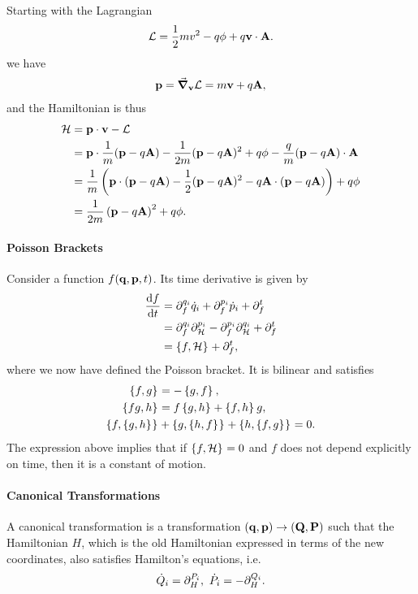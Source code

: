 
Starting with the Lagrangian
\begin{align*}
	\mathcal{L} = \frac{1}{2}mv^{2} - q\phi + q\vb{v}\cdot\vb{A}.
\end{align*}
we have
\begin{align*}
	\vb{p} = \grad_{\vb{v}}{\mathcal{L}} = m\vb{v} + q\vb{A},
\end{align*}
and the Hamiltonian is thus
\begin{align*}
	\mathcal{H} &= \vb{p}\cdot\vb{v} - \mathcal{L} \\
	     &= \vb{p}\cdot\frac{1}{m}(\vb{p} - q\vb{A}) - \frac{1}{2m}(\vb{p} - q\vb{A})^{2} + q\phi - \frac{q}{m}(\vb{p} - q\vb{A})\cdot\vb{A} \\
	     &= \frac{1}{m}\left(\vb{p}\cdot(\vb{p} - q\vb{A}) - \frac{1}{2}(\vb{p} - q\vb{A})^{2} - q\vb{A}\cdot(\vb{p} - q\vb{A})\right) + q\phi \\
	     &= \frac{1}{2m}\left(\vb{p} - q\vb{A}\right)^{2} + q\phi.
\end{align*}


\paragraph{Poisson Brackets}
Consider a function $f(\vb{q}, \vb{p}, t)$. Its time derivative is given by
\begin{align*}
	\dv{f}{t} &= \partial^{q_{i}}_{f}\dot{q}_{i} + \partial^{p_{i}}_{f}\dot{p}_{i} + \partial^{t}_{f} \\
	          &= \partial^{q_{i}}_{f}\partial^{p_{i}}_{\mathcal{H}} - \partial^{p_{i}}_{f}\partial^{q_{i}}_{\mathcal{H}} + \partial^{t}_{f} \\
	          &= \left\{f, \mathcal{H}\right\}_{} + \partial^{t}_{f},
\end{align*}
where we now have defined the Poisson bracket. It is bilinear and satisfies
\begin{align*}
	\left\{f, g\right\}_{}          &= -\left\{g, f\right\}_{}, \\
	\left\{fg, h\right\}_{}         &= f\left\{g, h\right\}_{} + \left\{f, h\right\}_{}g, \\
	\left\{f, \left\{g, h\right\}_{}\right\}_{} &+ \left\{g, \left\{h, f\right\}_{}\right\}_{} + \left\{h, \left\{f, g\right\}_{}\right\}_{} = 0.
\end{align*}
The expression above implies that if $\left\{f, \mathcal{H}\right\}_{} = 0$ and $f$ does not depend explicitly on time, then it is a constant of motion.

\paragraph{Canonical Transformations}
A canonical transformation is a transformation $(\vb{q}, \vb{p})\to (\vb{Q}, \vb{P})$ such that the Hamiltonian $H$, which is the old Hamiltonian expressed in terms of the new coordinates, also satisfies Hamilton's equations, i.e.
\begin{align*}
	\dot{Q}_{i} = \partial^{P_{i}}_{H},\ \dot{P}_{i} = -\partial^{Q_{i}}_{H}.
\end{align*}

